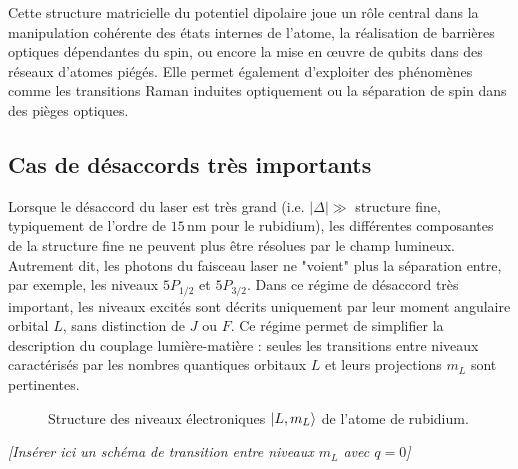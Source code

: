Cette structure matricielle du potentiel dipolaire joue un rôle central dans la manipulation cohérente des états internes de l’atome, la réalisation de barrières optiques dépendantes du spin, ou encore la mise en œuvre de qubits dans des réseaux d’atomes piégés. Elle permet également d’exploiter des phénomènes comme les transitions Raman induites optiquement ou la séparation de spin dans des pièges optiques.



 
 \subsection{Cas de désaccords très importants}

Lorsque le désaccord du laser est très grand (i.e. $|\Delta| \gg$ structure fine, typiquement de l’ordre de $15\,\mathrm{nm}$ pour le rubidium), les différentes composantes de la structure fine ne peuvent plus être résolues par le champ lumineux. Autrement dit, les photons du faisceau laser ne "voient" plus la séparation entre, par exemple, les niveaux $5P_{1/2}$ et $5P_{3/2}$. Dans ce régime de désaccord très important, les niveaux excités sont décrits uniquement par leur moment angulaire orbital $L$, sans distinction de $J$ ou $F$. Ce régime permet de simplifier la description du couplage lumière-matière : seules les transitions entre niveaux caractérisés par les nombres quantiques orbitaux $L$ et leurs projections $m_L$ sont pertinentes.

\begin{figure}[!htb]
	\centering
\caption{Structure des niveaux électroniques $\ket{L, m_L}$ de l’atome de rubidium.}

\end{figure}

\vspace{1em}
\begin{center}
\textit{[Insérer ici un schéma de transition entre niveaux $m_L$ avec $q = 0$]}
\end{center}

